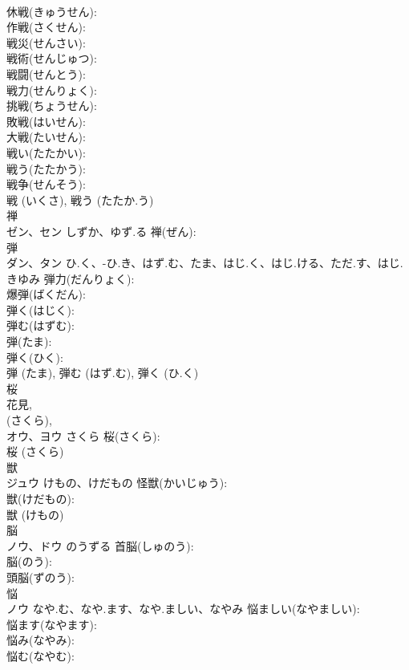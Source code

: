 \documentclass[8pt]{extreport}
\begin{document}
\begin{CJK}{UTF8}{min}
\\	休戦(きゅうせん): 
\\	作戦(さくせん): 
\\	戦災(せんさい): 
\\	戦術(せんじゅつ): 
\\	戦闘(せんとう): 
\\	戦力(せんりょく): 
\\	挑戦(ちょうせん): 
\\	敗戦(はいせん): 
\\	大戦(たいせん): 
\\	戦い(たたかい): 
\\	戦う(たたかう): 
\\	戦争(せんそう): 
\\	戦 (いくさ), 戦う (たたか.う)
\\	禅			
\\	ゼン、セン	しずか、ゆず.る	禅(ぜん): 
\\	弾			
\\	ダン、タン	ひ.く、-ひ.き、はず.む、たま、はじ.く、はじ.ける、ただ.す、はじ.きゆみ	弾力(だんりょく): 
\\	爆弾(ばくだん): 
\\	弾く(はじく): 
\\	弾む(はずむ): 
\\	弾(たま): 
\\	弾く(ひく): 
\\	弾 (たま), 弾む (はず.む), 弾く (ひ.く)
\\	桜			
\\	花見, 
\\	(さくら), 
\\	オウ、ヨウ	さくら	桜(さくら): 
\\	桜 (さくら)
\\	獣			
\\	ジュウ	けもの、けだもの	怪獣(かいじゅう): 
\\	獣(けだもの): 
\\	獣 (けもの)
\\	脳			
\\	ノウ、ドウ	のうずる	首脳(しゅのう): 
\\	脳(のう): 
\\	頭脳(ずのう): 
\\	悩			
\\	ノウ	なや.む、なや.ます、なや.ましい、なやみ	悩ましい(なやましい): 
\\	悩ます(なやます): 
\\	悩み(なやみ): 
\\	悩む(なやむ): 

\end{CJK}
\end{document}
